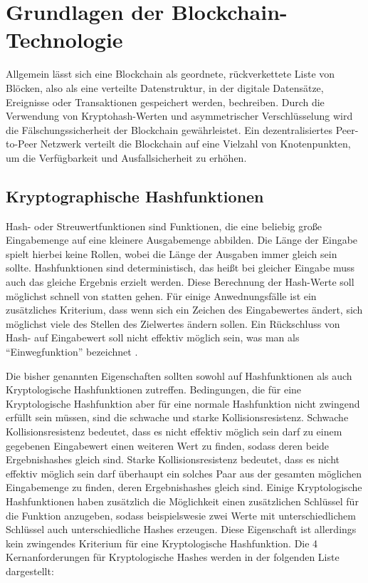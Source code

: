 \chapter{\label{chap:2grundlagen}Grundlagen der Blockchain-Technologie}

Allgemein lässt sich eine Blockchain als geordnete, rückverkettete Liste von Blöcken, also als eine verteilte Datenstruktur\cite{Block}, in der digitale Datensätze, Ereignisse oder Transaktionen gespeichert werden, bechreiben. 
Durch die Verwendung von Kryptohash-Werten und asymmetrischer Verschlüsselung wird die Fälschungssicherheit der Blockchain gewährleistet. Ein dezentralisiertes Peer-to-Peer Netzwerk verteilt die Blockchain auf eine Vielzahl von Knotenpunkten, um die Verfügbarkeit und Ausfallsicherheit zu erhöhen\cite{bafin}. 

	\section{Kryptographische Hashfunktionen}
		
		Hash- oder Streuwertfunktionen sind Funktionen, die eine beliebig große Eingabemenge auf eine kleinere Ausgabemenge abbilden. Die Länge der Eingabe spielt hierbei keine Rollen, wobei die Länge der Ausgaben immer gleich sein sollte. Hashfunktionen sind deterministisch, das heißt bei gleicher Eingabe muss auch das gleiche Ergebnis erzielt werden. Diese Berechnung der Hash-Werte soll möglichst schnell von statten gehen. Für einige Anwednungsfälle ist ein zusätzliches Kriterium, dass wenn sich ein Zeichen des Eingabewertes ändert, sich möglichst viele des Stellen des Zielwertes ändern sollen. Ein Rückschluss von Hash- auf Eingabewert soll nicht effektiv möglich sein, was man als "`Einwegfunktion"' bezeichnet \cite{kh}.
		
		Die bisher genannten Eigenschaften sollten sowohl auf Hashfunktionen als auch Kryptologische Hashfunktionen zutreffen. Bedingungen, die für eine Kryptologische Hashfunktion aber für eine normale Hashfunktion nicht zwingend erfüllt sein müssen, sind die schwache und starke Kollisionsresistenz. Schwache Kollisionsresistenz bedeutet, dass es nicht effektiv möglich sein darf zu einem gegebenen Eingabewert einen weiteren Wert zu finden, sodass deren beide Ergebnishashes gleich sind. Starke Kollisionsresistenz bedeutet, dass es nicht effektiv möglich sein darf überhaupt ein solches Paar aus der gesamten möglichen Eingabemenge zu finden, deren Ergebnishashes gleich sind. Einige Kryptologische Hashfunktionen haben zusätzlich die Möglichkeit einen zusätzlichen Schlüssel für die Funktion anzugeben, sodass beispielswesie zwei Werte mit unterschiedlichem Schlüssel auch unterschiedliche Hashes erzeugen. Diese Eigenschaft ist allerdings kein zwingendes Kriterium für eine Kryptologische Hashfunktion. Die 4 Kernanforderungen für Kryptologische Hashes werden in der folgenden Liste dargestellt: 
		\newpage
		
